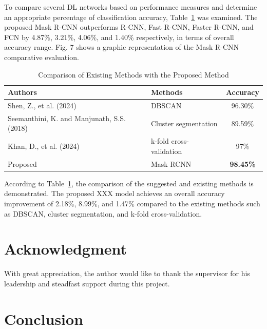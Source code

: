 \documentclass[conference]{IEEEtran}
\begin{document}
To compare several DL networks based on performance measures and determine an appropriate percentage of classification accuracy, Table~\ref{tab2} was examined. The proposed Mask R-CNN outperforms R-CNN, Fast R-CNN, Faster R-CNN, and FCN by 4.87\%, 3.21\%, 4.06\%, and 1.40\% respectively, in terms of overall accuracy range. Fig. 7 shows a graphic representation of the Mask R-CNN comparative evaluation.

\begin{table}[htbp]
\caption{Comparison of Existing Methods with the Proposed Method}
\begin{center}
\begin{tabular}{@{}p{4.3cm}p{2.1cm}c@{}}
\toprule
\textbf{Authors} & \textbf{Methods} & \textbf{Accuracy} \\
\midrule
Shen, Z., et al. (2024) \cite{b12} & DBSCAN & 96.30\% \\
Seemanthini, K. and Manjunath, S.S. (2018) \cite{b15} & Cluster segmentation & 89.59\% \\
Khan, D., et al. (2024) \cite{b17} & k-fold cross-validation & 97\% \\
Proposed & Mask RCNN & \textbf{98.45\%} \\
\bottomrule
\end{tabular}
\label{tab2}
\end{center}
\end{table}

According to Table~\ref{tab2}, the comparison of the suggested and existing methods is demonstrated. The proposed XXX model achieves an overall accuracy improvement of 2.18\%, 8.99\%, and 1.47\% compared to the existing methods such as DBSCAN, cluster segmentation, and k-fold cross-validation.

\section*{Acknowledgment}
With great appreciation, the author would like to thank the supervisor for his leadership and steadfast support during this project.

\section{Conclusion}
\end{document}
